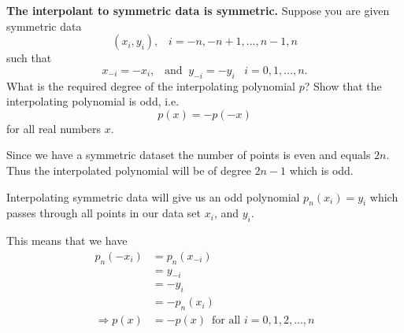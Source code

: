\textbf{The interpolant to symmetric data is symmetric.} Suppose you
are given symmetric data \[(x_i, y_i), \;\;\; i= -n, -n+1, \dots, n-1,
n\] such that \[x_{-i} = -x_i, \;\;\; \text{and} \;\; y_{-i} = -y_i
\;\;\; i=0,1,\dots,n.\]
What is the required degree of the interpolating polynomial $p$? Show
that the interpolating polynomial is odd, i.e. \[p(x) = -p(-x)\] for
all real numbers $x$.

{\color{blue}

Since we have a symmetric dataset the number of points is even and
equals $2n$. Thus the interpolated polynomial will be of degree $2n -
1$ which is odd.

Interpolating symmetric data will give us an odd polynomial $p_n(x_i) =
y_i$ which passes through all points in our data set $x_i$, and $y_i$.

This means that we have
\begin{align*}
p_n(-x_i) &= p_n(x_{-i}) \\
          &= y_{-i} \\
          &= -y_i \\
          &= - p_n(x_i) \\
\Rightarrow p(x) &= -p(x) \,\,\, \text{for all } i = 0,1,2,\dots,n
\end{align*}


}
